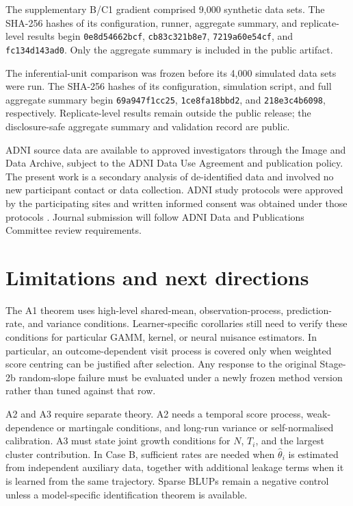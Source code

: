 \documentclass[11pt]{article}
\theoremstyle{definition}
\begin{document}
The supplementary B/C1 gradient comprised 9,000 synthetic data sets. The SHA-256 hashes of
its configuration, runner, aggregate summary, and replicate-level results begin
\texttt{0e8d54662bcf}, \texttt{cb83c321b8e7}, \texttt{7219a60e54cf}, and
\texttt{fc134d143ad0}. Only the aggregate summary is included in the public artifact.

The inferential-unit comparison was frozen before its 4,000 simulated data sets were run.
The SHA-256 hashes of its configuration, simulation script, and full aggregate summary begin
\texttt{69a947f1cc25}, \texttt{1ce8fa18bbd2}, and \texttt{218e3c4b6098}, respectively.
Replicate-level results remain outside the public release; the disclosure-safe aggregate
summary and validation record are public.

ADNI source data are available to approved investigators through the Image and Data Archive,
subject to the ADNI Data Use Agreement and publication policy. The present work is a
secondary analysis of de-identified data and involved no new participant contact or data
collection. ADNI study protocols were approved by the participating sites and written
informed consent was obtained under those protocols \cite{weiner2010}. Journal submission
will follow ADNI Data and Publications Committee review requirements.

\section{Limitations and next directions}

The A1 theorem uses high-level shared-mean, observation-process, prediction-rate, and
variance conditions. Learner-specific corollaries still need to verify these conditions for
particular GAMM, kernel, or neural nuisance estimators. In particular, an outcome-dependent
visit process is covered only when weighted score centring can be justified after selection.
Any response to the original Stage-2b random-slope failure must be evaluated under a newly
frozen method version rather than tuned against that row.

A2 and A3 require separate theory. A2 needs a temporal score process, weak-dependence or
martingale conditions, and long-run variance or self-normalised calibration. A3 must state
joint growth conditions for $N$, $T_i$, and the largest cluster contribution. In Case B,
sufficient rates are needed when $\widehat\theta_i$ is estimated from independent auxiliary
data, together with additional leakage terms when it is learned from the same trajectory.
Sparse BLUPs remain a negative control unless a model-specific identification theorem is
available.
\end{document}

